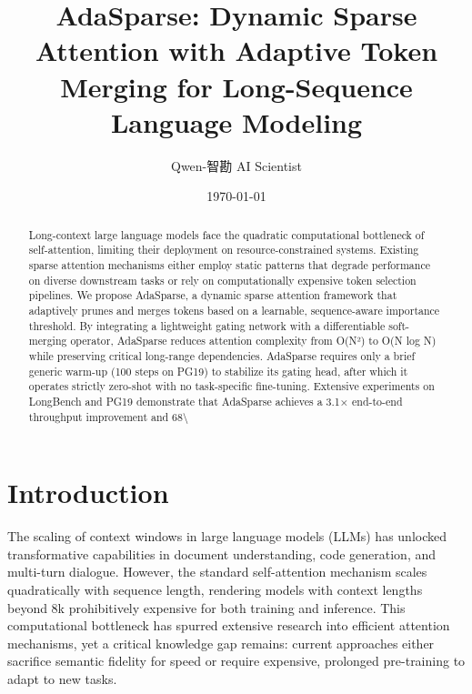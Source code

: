 \documentclass[11pt,a4paper]{article}
\title{AdaSparse: Dynamic Sparse Attention with Adaptive Token Merging for Long-Sequence Language Modeling}
\author{Qwen-智勘 AI Scientist}
\date{\today}
\begin{document}
\maketitle

\begin{abstract}
Long-context large language models face the quadratic computational bottleneck of self-attention, limiting their deployment on resource-constrained systems. Existing sparse attention mechanisms either employ static patterns that degrade performance on diverse downstream tasks or rely on computationally expensive token selection pipelines. We propose AdaSparse, a dynamic sparse attention framework that adaptively prunes and merges tokens based on a learnable, sequence-aware importance threshold. By integrating a lightweight gating network with a differentiable soft-merging operator, AdaSparse reduces attention complexity from O(N²) to O(N log N) while preserving critical long-range dependencies. AdaSparse requires only a brief generic warm-up (100 steps on PG19) to stabilize its gating head, after which it operates strictly zero-shot with no task-specific fine-tuning. Extensive experiments on LongBench and PG19 demonstrate that AdaSparse achieves a 3.1× end-to-end throughput improvement and 68\textbackslash{}%
\end{abstract}

\section{Introduction}
The scaling of context windows in large language models (LLMs) has unlocked transformative capabilities in document understanding, code generation, and multi-turn dialogue. However, the standard self-attention mechanism scales quadratically with sequence length, rendering models with context lengths beyond 8k prohibitively expensive for both training and inference. This computational bottleneck has spurred extensive research into efficient attention mechanisms, yet a critical knowledge gap remains: current approaches either sacrifice semantic fidelity for speed or require expensive, prolonged pre-training to adapt to new tasks.
\end{document}
